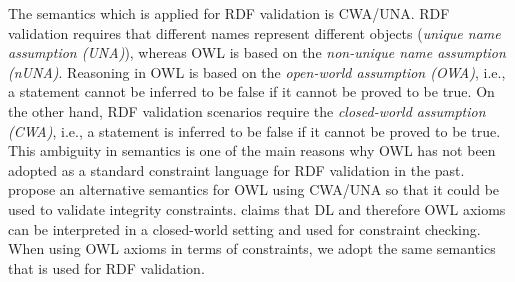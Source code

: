 \documentclass[conference]{IEEEtran}
\newcommand{\ms}[1]{\texttt{#1}}
\newcommand{\tb}[1]{\todo[size=\small, color=green!40]{\textbf{Thomas:} #1}}
\begin{document}
The semantics which is applied for RDF validation is CWA/UNA.
RDF validation requires that different names represent different objects ({\em unique name assumption (UNA)}), whereas
OWL is based on the {\em non-unique name assumption (nUNA)}.  
Reasoning in OWL is based on the {\em open-world assumption (OWA)}, i.e., a statement cannot be inferred to be false if it cannot be proved to be true. 
On the other hand, RDF validation scenarios require the {\em closed-world assumption (CWA)}, i.e., a statement is inferred to be false if it cannot be proved to be true. 
This ambiguity in semantics is one of the main reasons why OWL has not been adopted as a standard constraint language for RDF validation in the past.  
\cite{Tao-2010} propose an alternative semantics for OWL using CWA/UNA so that it could be used to validate integrity constraints.
\cite{Patel-Schneider-2015} claims that DL and therefore OWL axioms can be interpreted in a closed-world setting and used for constraint checking.
When using OWL axioms in terms of constraints, we adopt the same semantics that is used for RDF validation.
\end{document}
